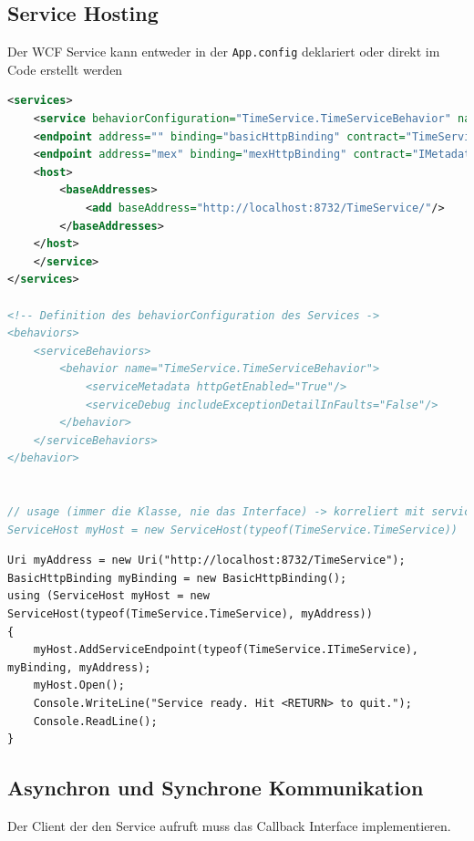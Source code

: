\documentclass[
a4paper,
oneside,
10pt,
fleqn,
headsepline,
toc=listofnumbered, 
bibliography=totocnumbered]{scrartcl}
\begin{document}
\subsection{Service Hosting}
Der WCF Service kann entweder in der \lstinline|App.config| deklariert oder direkt im Code erstellt werden
\begin{lstlisting}[language=XML, caption=App.config]
<services>
	<service behaviorConfiguration="TimeService.TimeServiceBehavior" name="TimeService.TimeService">
	<endpoint address="" binding="basicHttpBinding" contract="TimeService.ITimeService"/>
	<endpoint address="mex" binding="mexHttpBinding" contract="IMetadataExchange"/>
	<host>
		<baseAddresses>
			<add baseAddress="http://localhost:8732/TimeService/"/>
		</baseAddresses>
	</host>
	</service>
</services>

<!-- Definition des behaviorConfiguration des Services ->
<behaviors>
	<serviceBehaviors>
		<behavior name="TimeService.TimeServiceBehavior">
			<serviceMetadata httpGetEnabled="True"/>
			<serviceDebug includeExceptionDetailInFaults="False"/>
		</behavior>
	</serviceBehaviors>
</behavior>


// usage (immer die Klasse, nie das Interface) -> korreliert mit service name im App.config
ServiceHost myHost = new ServiceHost(typeof(TimeService.TimeService))
\end{lstlisting}
\begin{lstlisting}[caption=Service Hosting (Code) ]
Uri myAddress = new Uri("http://localhost:8732/TimeService");
BasicHttpBinding myBinding = new BasicHttpBinding();
using (ServiceHost myHost = new ServiceHost(typeof(TimeService.TimeService), myAddress))
{
	myHost.AddServiceEndpoint(typeof(TimeService.ITimeService), myBinding, myAddress);
	myHost.Open();
	Console.WriteLine("Service ready. Hit <RETURN> to quit.");
	Console.ReadLine();
}
\end{lstlisting}



\clearpage

\subsection{Asynchron und Synchrone Kommunikation}
Der Client der den Service aufruft muss das Callback Interface implementieren.
\end{document}
